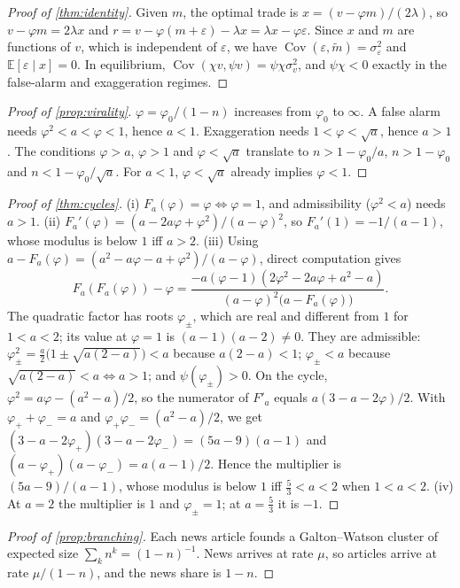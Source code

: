 \documentclass[10pt,twocolumn,letterpaper]{article}
\theoremstyle{plain}
\theoremstyle{definition}
\theoremstyle{remark}
\newcommand{\E}{\mathbb{E}}
\DeclareMathOperator{\Cov}{Cov}
\begin{document}
\begin{proof}[Proof of \cref{thm:identity}]
Given $m$, the optimal trade is $x=(v-\varphi m)/(2\lambda)$, so $v-\varphi m=2\lambda x$ and $r=v-\varphi(m+\varepsilon)-\lambda x=\lambda x-\varphi\varepsilon$. Since $x$ and $m$ are functions of $v$, which is independent of $\varepsilon$, we have $\Cov(\varepsilon,\tilde m)=\sigma_\varepsilon^2$ and $\E[\varepsilon\mid x]=0$. In equilibrium, $\Cov(\chi v,\psi v)=\psi\chi\sigma_v^2$, and $\psi\chi<0$ exactly in the false-alarm and exaggeration regimes.
\end{proof}

\begin{proof}[Proof of \cref{prop:virality}]
$\varphi=\varphi_0/(1-n)$ increases from $\varphi_0$ to $\infty$. A false alarm needs $\varphi^2<a<\varphi<1$, hence $a<1$. Exaggeration needs $1<\varphi<\sqrt a$, hence $a>1$. The conditions $\varphi>a$, $\varphi>1$ and $\varphi<\sqrt a$ translate to $n>1-\varphi_0/a$, $n>1-\varphi_0$ and $n<1-\varphi_0/\sqrt a$. For $a<1$, $\varphi<\sqrt a$ already implies $\varphi<1$.
\end{proof}

\begin{proof}[Proof of \cref{thm:cycles}]
(i) $F_a(\varphi)=\varphi\iff\varphi=1$, and admissibility ($\varphi^2<a$) needs $a>1$.
(ii) $F_a'(\varphi)=(a-2a\varphi+\varphi^2)/(a-\varphi)^2$, so $F_a'(1)=-1/(a-1)$, whose modulus is below $1$ iff $a>2$.
(iii) Using $a-F_a(\varphi)=(a^2-a\varphi-a+\varphi^2)/(a-\varphi)$, direct computation gives
\[
  F_a(F_a(\varphi))-\varphi=\frac{-a(\varphi-1)(2\varphi^2-2a\varphi+a^2-a)}{(a-\varphi)^2\big(a-F_a(\varphi)\big)} .
\]
The quadratic factor has roots $\varphi_\pm$, which are real and different from $1$ for $1<a<2$; its value at $\varphi=1$ is $(a-1)(a-2)\neq0$. They are admissible: $\varphi_\pm^2=\tfrac a2\big(1\pm\sqrt{a(2-a)}\big)<a$ because $a(2-a)<1$; $\varphi_\pm<a$ because $\sqrt{a(2-a)}<a\iff a>1$; and $\psi(\varphi_\pm)>0$. On the cycle, $\varphi^2=a\varphi-(a^2-a)/2$, so the numerator of $F'_a$ equals $a(3-a-2\varphi)/2$. With $\varphi_++\varphi_-=a$ and $\varphi_+\varphi_-=(a^2-a)/2$, we get $(3-a-2\varphi_+)(3-a-2\varphi_-)=(5a-9)(a-1)$ and $(a-\varphi_+)(a-\varphi_-)=a(a-1)/2$. Hence the multiplier is $(5a-9)/(a-1)$, whose modulus is below $1$ iff $\tfrac53<a<2$ when $1<a<2$.
(iv) At $a=2$ the multiplier is $1$ and $\varphi_\pm=1$; at $a=\tfrac53$ it is $-1$.
\end{proof}

\begin{proof}[Proof of \cref{prop:branching}]
Each news article founds a Galton--Watson cluster of expected size $\sum_kn^k=(1-n)^{-1}$. News arrives at rate $\mu$, so articles arrive at rate $\mu/(1-n)$, and the news share is $1-n$.
\end{proof}
\end{document}
